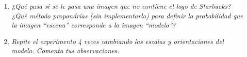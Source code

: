 \documentclass{article}
\begin{document}
\begin{enumerate}
\begin{enumerate}
 \item \textit{¿Qué pasa si se le pasa una imagen que no contiene el logo de Starbucks? 
¿Qué  método  propondrías  (sin  implementarlo)  para  definir la 
probabilidad que la imagen “escena” corresponde a la imagen “modelo”?}

 \item \textit {Repite el experimento 4 veces cambiando las escalas y orientaciones del 
modelo. Comenta tus observaciones.}
 
 \end{enumerate}

\end{enumerate}
\end{document}
